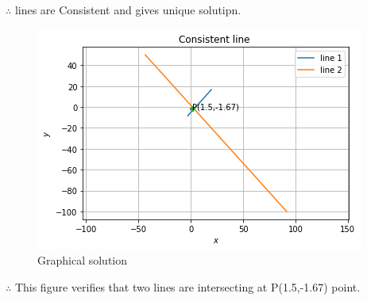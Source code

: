 \documentclass[journal,12pt,twocolumn]{IEEEtran}
\begin{document}
   $\therefore$ lines are Consistent and gives unique solutipn.
\begin{figure}[H]
    \includegraphics[width= \columnwidth]{consistent line.png}
    \caption{Graphical solution}
    \label{Fig:Graphical Solution}
\end{figure}
$\therefore$ This figure verifies that two lines are intersecting at P(1.5,-1.67) point.
\end{document}
